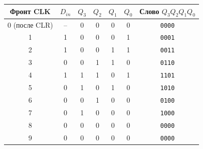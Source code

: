 \begin{tabular}{cc|cccc|c}
\toprule
Фронт CLK & $D_{in}$ & $Q_3$ & $Q_2$ & $Q_1$ & $Q_0$ & Слово $Q_3Q_2Q_1Q_0$ \\
\midrule
0 (после CLR) & -- & 0 & 0 & 0 & 0 & \texttt{0000} \\
1 & 1 & 0 & 0 & 0 & 1 & \texttt{0001} \\
2 & 1 & 0 & 0 & 1 & 1 & \texttt{0011} \\
3 & 0 & 0 & 1 & 1 & 0 & \texttt{0110} \\
4 & 1 & 1 & 1 & 0 & 1 & \texttt{1101} \\
5 & 0 & 1 & 0 & 1 & 0 & \texttt{1010} \\
6 & 0 & 0 & 1 & 0 & 0 & \texttt{0100} \\
7 & 0 & 1 & 0 & 0 & 0 & \texttt{1000} \\
8 & 0 & 0 & 0 & 0 & 0 & \texttt{0000} \\
9 & 0 & 0 & 0 & 0 & 0 & \texttt{0000} \\
\bottomrule
\end{tabular}